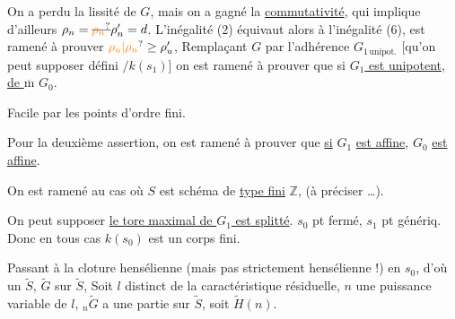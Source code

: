 On a perdu la lissité de $G$, mais on a gagné la \uline{commutativité}, qui implique d'ailleurs $\rho_n=\deleted{\unsure{\rho_n}}\rho'_n=d$. L'inégalité (2) équivaut alors à l'inégalité (6),  
est ramené à prouver $\unsure{\rho_u|\rho_n}\geq\rho'_u$,  Remplaçant $G$ par l'adhérence  $G_{1\,\mathrm{unipot}.}$ [qu'on peut supposer défini $/k(s_1)$] on est ramené  à prouver que si \uline{$G_1$ est unipotent}, \uline{de $\overline{\mathrm m}$} $G_0$.

Facile par les points d'ordre fini.

Pour la deuxième assertion, on est ramené à prouver que \uline{si} $G_1$ \uline{est affine}, $G_0$ \uline{est affine}.

On est ramené au cas  où $S$ est  schéma  de \uline{type fini}   $\mathbb Z$,  (à préciser \ldots).

 On peut supposer  \uline{le tore maximal de $G_1$ est splitté}. $s_0$ pt fermé, $s_1$ pt génériq. Donc en tous cas $k(s_0)$ est un corps fini.


Passant à la cloture hensélienne (mais pas strictement hensélienne !) en $s_0$, d'où un $\widetilde S$, $\widetilde G$ sur $\widetilde S$,  Soit $l$ distinct de la caractéristique résiduelle, $n$ une puissance variable de $l$, $ {}_n\widetilde G$ a une partie  sur $\widetilde S$, soit $\widetilde H(n)$.

